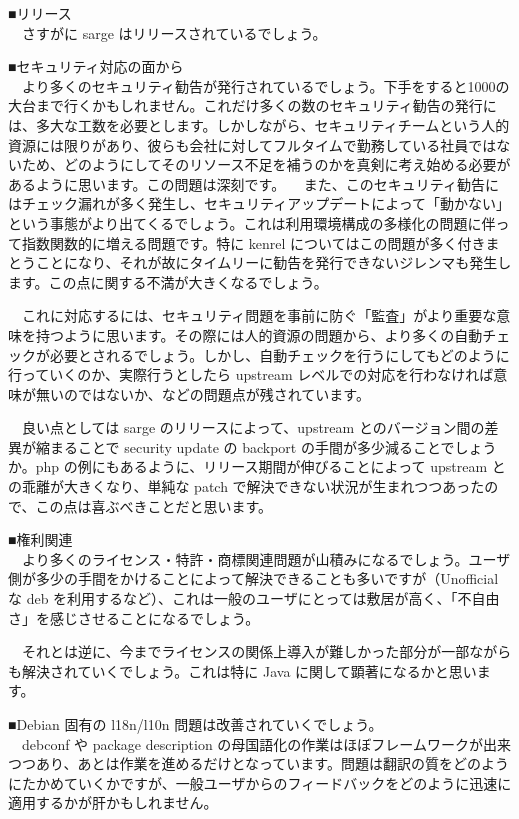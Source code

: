 \documentclass[mingoth]{jsarticle}
\begin{document}
■リリース\\
　さすがに sarge はリリースされているでしょう。


■セキュリティ対応の面から\\
　より多くのセキュリティ勧告が発行されているでしょう。下手をすると1000の大台まで行くかもしれません。これだけ多くの数のセキュリティ勧告の発行には、多大な工数を必要とします。しかしながら、セキュリティチームという人的資源には限りがあり、彼らも会社に対してフルタイムで勤務している社員ではないため、どのようにしてそのリソース不足を補うのかを真剣に考え始める必要があるように思います。この問題は深刻です。
　また、このセキュリティ勧告にはチェック漏れが多く発生し、セキュリティアップデートによって「動かない」という事態がより出てくるでしょう。これは利用環境構成の多様化の問題に伴って指数関数的に増える問題です。特に kenrel についてはこの問題が多く付きまとうことになり、それが故にタイムリーに勧告を発行できないジレンマも発生します。この点に関する不満が大きくなるでしょう。

　これに対応するには、セキュリティ問題を事前に防ぐ「監査」がより重要な意味を持つように思います。その際には人的資源の問題から、より多くの自動チェックが必要とされるでしょう。しかし、自動チェックを行うにしてもどのように行っていくのか、実際行うとしたら upstream レベルでの対応を行わなければ意味が無いのではないか、などの問題点が残されています。

　良い点としては sarge のリリースによって、upstream とのバージョン間の差異が縮まることで security update の backport の手間が多少減ることでしょうか。php の例にもあるように、リリース期間が伸びることによって upstream との乖離が大きくなり、単純な patch で解決できない状況が生まれつつあったので、この点は喜ぶべきことだと思います。


■権利関連\\
　より多くのライセンス・特許・商標関連問題が山積みになるでしょう。ユーザ側が多少の手間をかけることによって解決できることも多いですが（Unofficial な deb を利用するなど）、これは一般のユーザにとっては敷居が高く、「不自由さ」を感じさせることになるでしょう。

　それとは逆に、今までライセンスの関係上導入が難しかった部分が一部ながらも解決されていくでしょう。これは特に Java に関して顕著になるかと思います。


■Debian 固有の l18n/l10n 問題は改善されていくでしょう。\\
　debconf や package description の母国語化の作業はほぼフレームワークが出来つつあり、あとは作業を進めるだけとなっています。問題は翻訳の質をどのようにたかめていくかですが、一般ユーザからのフィードバックをどのように迅速に適用するかが肝かもしれません。
\end{document}
